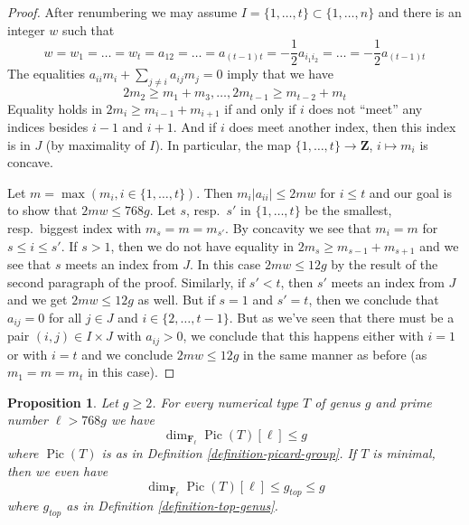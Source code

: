 \documentclass{stacks-project}
\theoremstyle{plain}
\newtheorem{proposition}[subsection]{Proposition}
\theoremstyle{definition}
\theoremstyle{remark}
\numberwithin{equation}{subsection}
\def\Pic{\mathop{\mathrm{Pic}}\nolimits}
\begin{document}
\begin{proof}
\medskip\noindent
After renumbering we may assume $I = \{1, \ldots, t\} \subset \{1, \ldots, n\}$
and there is an integer $w$ such that
$$
w = w_1 = \ldots = w_t =
a_{12} = \ldots = a_{(t - 1) t} =
-\frac{1}{2} a_{i_1i_2} = \ldots = -\frac{1}{2} a_{(t - 1) t}
$$
The equalities $a_{ii}m_i + \sum_{j \not = i} a_{ij}m_j = 0$ imply
that we have
$$
2m_2 \geq m_1 + m_3, \ldots, 2m_{t - 1} \geq m_{t - 2} + m_t
$$
Equality holds in $2m_i \geq m_{i - 1} + m_{i + 1}$
if and only if $i$ does not ``meet'' any indices besides
$i - 1$ and $i + 1$. And if $i$ does meet
another index, then this index is in $J$ (by maximality of $I$).
In particular, the map
$\{1, \ldots, t\} \to \mathbf{Z}$, $i \mapsto m_i$ is concave.

\medskip\noindent
Let $m = \max(m_i, i \in \{1, \ldots, t\})$. Then
$m_i|a_{ii}| \leq 2mw$ for $i \leq t$ and
our goal is to show that $2mw \leq 768g$.
Let $s$, resp.\ $s'$ in $\{1, \ldots, t\}$ be the
smallest, resp.\ biggest index with $m_s = m = m_{s'}$.
By concavity we see that $m_i = m$ for $s \leq i \leq s'$.
If $s > 1$, then we do not have equality in
$2m_s \geq m_{s - 1} + m_{s + 1}$
and we see that $s$ meets an index from $J$.
In this case $2mw \leq 12g$ by the result of the second paragraph
of the proof.
Similarly, if $s' < t$, then $s'$ meets an index from $J$
and we get $2mw \leq 12g$ as well.
But if $s = 1$ and $s' = t$, then we conclude
that $a_{ij} = 0$ for all $j \in J$ and $i \in \{2, \ldots, t - 1\}$.
But as we've seen that there must be a pair $(i, j) \in I \times J$
with $a_{ij} > 0$, we conclude that this happens either with
$i = 1$ or with $i = t$ and we conclude $2mw \leq 12g$
in the same manner as before (as $m_1 = m = m_t$ in this case).
\end{proof}

\begin{proposition}
\label{proposition-bound-picard-group}
Let $g \geq 2$. For every numerical type $T$ of genus $g$
and prime number $\ell > 768g$ we have
$$
\dim_{\mathbf{F}_\ell} \Pic(T)[\ell] \leq g
$$
where $\Pic(T)$ is as in Definition \ref{definition-picard-group}.
If $T$ is minimal, then we even have
$$
\dim_{\mathbf{F}_\ell} \Pic(T)[\ell] \leq g_{top} \leq g
$$
where $g_{top}$ as in Definition \ref{definition-top-genus}.
\end{proposition}
\end{document}
